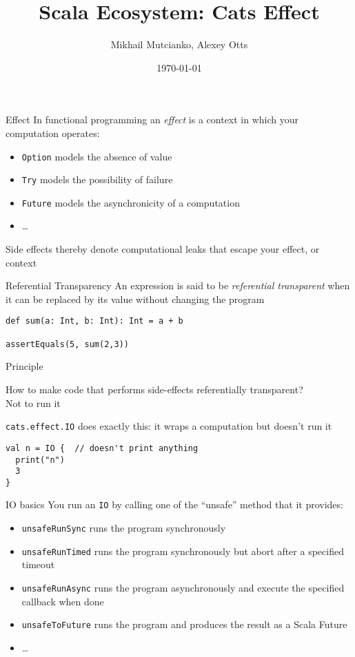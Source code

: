 \documentclass[aspectratio=169]{beamer}
\title{Scala Ecosystem: Cats Effect}
\author{Mikhail Mutcianko, Alexey Otts}
\institute{СПБгУ, СП}
\date{\today}
\begin{document}
\frame{\titlepage}

\begin{frame}{Effect}
  In functional programming an \textit{effect} is a context in which your computation operates:
  \begin{itemize}
    \item \texttt{Option} models the absence of value
    \item \texttt{Try} models the possibility of failure
    \item \texttt{Future} models the asynchronicity of a computation
    \item \ldots
  \end{itemize}
  \bigskip
  Side effects thereby denote computational leaks that escape your effect, or context
\end{frame}

\begin{frame}[fragile]{Referential Transparency}
 An expression is said to be \textit{referential transparent} when it can be replaced by its value without
 changing the program
 \bigskip
\begin{verbatim}
def sum(a: Int, b: Int): Int = a + b

assertEquals(5, sum(2,3))
\end{verbatim}
\end{frame}

\begin{frame}[fragile]{Principle}
\begin{center}
How to make code that performs side-effects referentially transparent?\\
\pause
  \Large Not to run it
\end{center}
\pause
\texttt{cats.effect.IO} does exactly this: it wraps a computation but doesn’t run it

\begin{verbatim}
val n = IO {  // doesn't print anything
  print("n")
  3
}
\end{verbatim}
\end{frame}

\begin{frame}[fragile]{IO basics}
You run an \texttt{IO} by calling one of the “unsafe” method that it provides:
\begin{itemize}
  \item \texttt{unsafeRunSync} runs the program synchronously
  \item \texttt{unsafeRunTimed} runs the program synchronously but abort after a specified timeout 
  \item \texttt{unsafeRunAsync} runs the program asynchronously and execute the specified callback when done
  \item \texttt{unsafeToFuture} runs the program and produces the result as a Scala Future 
  \item \ldots
\end{itemize}
\end{frame}
\end{document}
